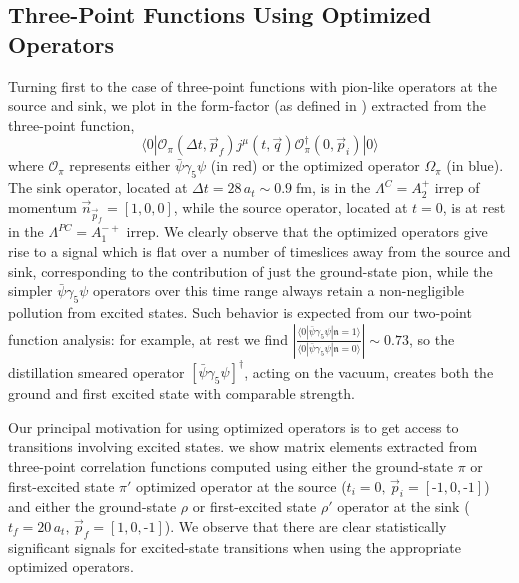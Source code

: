 \subsection{Three-Point Functions Using Optimized Operators} \label{sec::OptOps}
Turning first to the case of three-point functions with pion-like operators at the source and sink, we plot in  the form-factor (as defined in ) extracted from the three-point function, 
\begin{equation*}
\langle 0 | \mathcal{O}_\pi(\Delta t,\vec{p}_f) j^\mu(t, \vec{q}) \mathcal{O}^\dagger_\pi(0,\vec{p}_i) | 0 \rangle
\end{equation*}
where $\mathcal{O}_\pi$ represents either $\bar{\psi}\gamma_5\psi$ (in red) or the optimized operator $\Omega_\pi$ (in blue). The sink operator, located at $\Delta t = 28\, a_t \sim 0.9 \;\mathrm{fm}$, is in the $\Lambda^C = A_2^+$ irrep of momentum $\vec{n}_{\vec{p}_f} = [1,0,0]$, while the source operator, located at $t = 0$, is at rest in the $\Lambda^{PC} = A_1^{-+}$ irrep. We clearly observe that the optimized operators give rise to a signal which is flat over a number of timeslices away from the source and sink, corresponding to the contribution of just the ground-state pion, while the simpler $\bar{\psi}\gamma_5\psi$ operators over this time range always retain a non-negligible pollution from excited states. Such behavior is expected from our two-point function analysis: for example, at rest we find $\left| \tfrac{ \langle 0 | \bar{\psi}\gamma_5 \psi | \mathfrak{n} = 1\rangle}{  \langle 0 | \bar{\psi}\gamma_5 \psi | \mathfrak{n} = 0\rangle} \right| \sim 0.73$, so the distillation smeared operator $\left[ \bar{\psi} \gamma_5 \psi \right]^\dagger $, acting on the vacuum, creates both the ground and first excited state with comparable strength.

Our principal motivation for using optimized operators is to get access to transitions involving excited states.  we show matrix elements extracted from three-point correlation functions computed using either the ground-state $\pi$ or first-excited state $\pi'$ optimized operator at the source ($t_i=0,\, \vec{p}_i=[\text{-}1, 0, \text{-}1]$) and either the ground-state $\rho$ or first-excited state $\rho'$ operator at the sink ($t_f = 20\,a_t,\, \vec{p}_f=[1, 0, \text{-}1]$). We observe that there are clear statistically significant signals for excited-state transitions when using the appropriate optimized operators.

